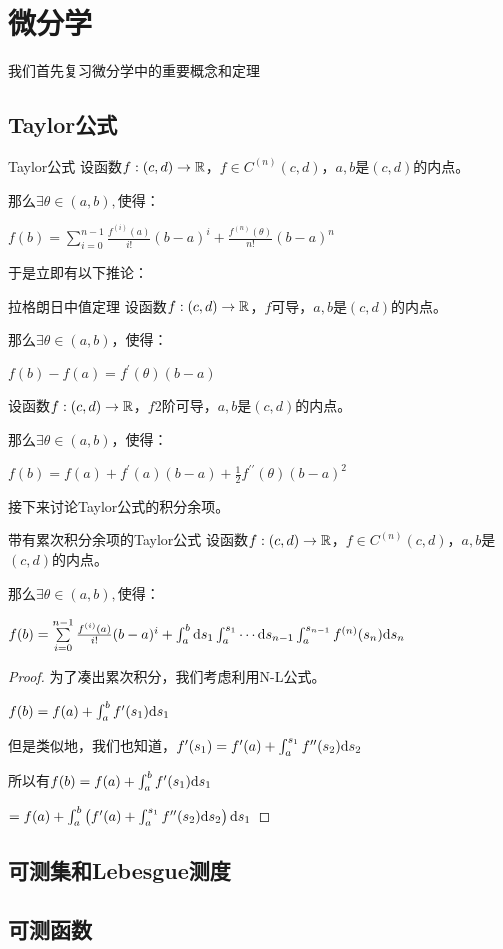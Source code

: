 \documentclass[12pt, a4paper, oneside, UTF8]{ctexbook}
\begin{document}
% 
\else
\fi
\chapter{微分学}
	我们首先复习微分学中的重要概念和定理
	\section{Taylor公式}
		\begin{them}{Taylor公式}{}
			设函数$f:(c,d) \rightarrow \mathbb{R}$，$f \in C^{(n)} (c,d)$，$a,b$是$(c,d)$的内点。
			
			那么$\exists \theta \in (a,b),$使得：
			
			$f(b) = \sum\limits_{i=0}^{n-1} \frac{f^{(i)}(a)}{i!} (b-a)^i+\frac{f^{(n)}(\theta)}{n!} (b-a)^n$
		\end{them}
		于是立即有以下推论：
		\begin{corollary}{拉格朗日中值定理}{}
			设函数$f:(c,d) \rightarrow \mathbb{R}$，$f$可导，$a,b$是$(c,d)$的内点。
			
			那么$\exists \theta \in (a,b)$，使得：
			
			$f(b)-f(a) = f^{\prime} (\theta) (b-a)$
		\end{corollary}
		\begin{corollary}{}{}
			设函数$f:(c,d) \rightarrow \mathbb{R}$，$f$2阶可导，$a,b$是$(c,d)$的内点。
			
			那么$\exists \theta \in (a,b)$，使得：
			
			$f(b)= f(a) + f^{\prime}(a)(b-a) + \frac{1}{2}f^{\prime\prime} (\theta) (b-a)^2$
		\end{corollary}
		接下来讨论Taylor公式的积分余项。
		\begin{them}{带有累次积分余项的Taylor公式}{}
			设函数$f:(c,d) \rightarrow \mathbb{R}$，$f \in C^{(n)} (c,d)$，$a,b$是$(c,d)$的内点。
			
			那么$\exists \theta \in (a,b),$使得：
			
			$f(b) = \sum\limits_{i=0}^{n-1} \frac{f^{(i)}(a)}{i!} (b-a)^i+\int_{a}^{b} \mathrm{d} s_1 \int_{a}^{s_1} \cdots \mathrm{d} s_{n-1}\int_{a}^{s_{n-1}} f^{(n)} (s_n) \mathrm{d} s_n$
		\end{them}
		\begin{proof}
			为了凑出累次积分，我们考虑利用N-L公式。
			
			$f(b) = f(a) + \int_{a}^{b} f^{\prime} (s_1) \mathrm{d} s_1$
			
			但是类似地，我们也知道，$f^{\prime} (s_1) = f^{\prime} (a) + \int_{a}^{s_1} f^{\prime\prime} (s_2) \mathrm{d} s_2$
			
			所以有$f(b)=f(a) + \int_{a}^{b} f^{\prime} (s_1) \mathrm{d} s_1$
			
			$=f(a) + \int_{a}^{b} \left(f^{\prime} (a) + \int_{a}^{s_1} f^{\prime\prime} (s_2) \mathrm{d} s_2\right) \mathrm{d} s_1$
			
			
		\end{proof}
	\section{可测集和Lebesgue测度}
	\section{可测函数}

\ifx\allfiles\undefined
\end{document}
